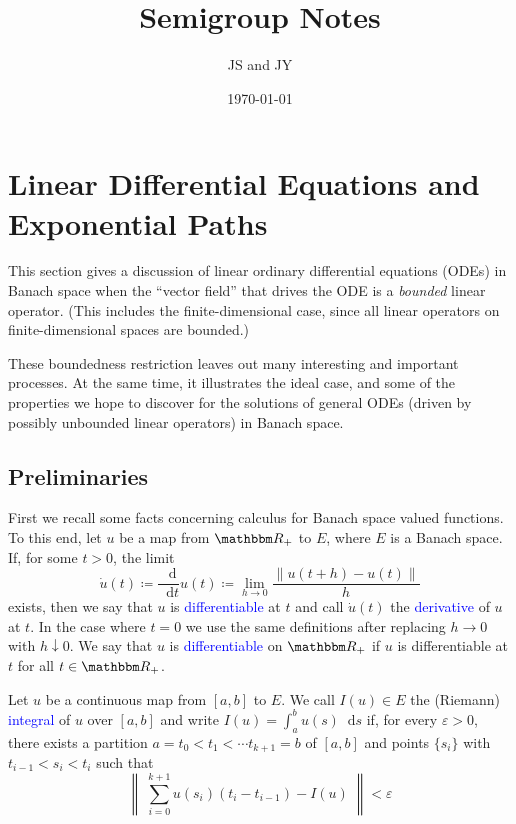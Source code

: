 \documentclass[12pt, reqno]{amsart}
\newcommand{\1}{\mathbbm 1}
\newcommand*\diff{\mathop{}\!\mathrm{d}}
\newcommand{\RR}{\mathbbm R}
\renewcommand{\epsilon}{\varepsilon}
\theoremstyle{plain}
\theoremstyle{definition}
\newcommand{\navy}[1]{\textcolor{blue}{#1}}
\begin{document}
\title{Semigroup Notes}

\author{JS and JY}

\date{\today}

\maketitle




\section{Linear Differential Equations and Exponential Paths}

This section gives a discussion of linear ordinary differential equations (ODEs)
in Banach space when the ``vector field'' that drives the ODE is a
\emph{bounded} linear operator.  (This includes the finite-dimensional case,
since all linear operators on finite-dimensional spaces are bounded.)

These boundedness restriction leaves out many interesting and important
processes.  At the same time, it illustrates the ideal case, and some of the
properties we hope to discover for the solutions of general ODEs (driven by
possibly unbounded linear operators) in Banach space.  


\subsection{Preliminaries}\label{ss:prel}

First we recall some facts concerning calculus for Banach space valued
functions. To this end, let $u$ be a map from $\RR_+$ to $E$, where $E$ is a
Banach space. If, for some $t > 0$, the limit
%
\begin{equation*}
    \dot u(t)
    \coloneq \frac{\diff }{\diff t} u(t)
    \coloneq \lim_{h \to 0} \frac{\| u(t + h) - u(t) \|}{h}
\end{equation*}
%
exists, then we say that $u$ is \navy{differentiable} at $t$ and call $\dot u(t)$
the \navy{derivative} of $u$ at $t$.  In the case where $t=0$ we use the same
definitions after replacing $h \to 0$ with $h \downarrow 0$.
We say that $u$ is \navy{differentiable} on $\RR_+$ if $u$ is differentiable at
$t$ for all $t \in \RR_+$.


Let $u$ be a continuous map from $[a, b]$ to $E$.  We call $I(u) \in E$ the
(Riemann) \navy{integral} of $u$ over $[a,b]$ and write $I(u) = \int_a^b u(s) \diff s$ if,
for every $\epsilon > 0$, there exists  a partition 
$a = t_0 < t_1 < \cdots t_{k+1} = b$ of $[a, b]$ and points $\{s_i\}$ with
$t_{i-1} < s_i < t_i$ such that
%
\begin{equation*}
    \left\|
        \;
        \sum_{i=0}^{k+1} u(s_i) (t_i - t_{i-1})
        - I(u)
        \;
    \right\| < \epsilon
\end{equation*}
%
\end{document}
